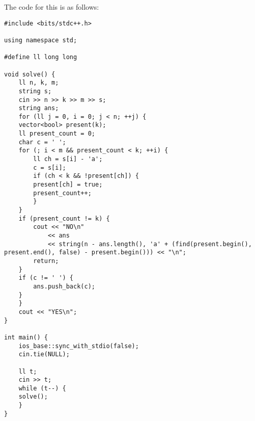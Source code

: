 \documentclass{article}
\begin{document}
The code for this is as follows:
\begin{verbatim}
#include <bits/stdc++.h>

using namespace std;

#define ll long long

void solve() {
    ll n, k, m;
    string s;
    cin >> n >> k >> m >> s;
    string ans;
    for (ll j = 0, i = 0; j < n; ++j) {
    vector<bool> present(k);
    ll present_count = 0;
    char c = ' ';
    for (; i < m && present_count < k; ++i) {
        ll ch = s[i] - 'a';
        c = s[i];
        if (ch < k && !present[ch]) {
        present[ch] = true;
        present_count++;
        }
    }
    if (present_count != k) {
        cout << "NO\n"
            << ans
            << string(n - ans.length(), 'a' + (find(present.begin(), present.end(), false) - present.begin())) << "\n";
        return;
    }
    if (c != ' ') {
        ans.push_back(c);
    }
    }
    cout << "YES\n";
}

int main() {
    ios_base::sync_with_stdio(false);
    cin.tie(NULL);

    ll t;
    cin >> t;
    while (t--) {
    solve();
    }
}
\end{verbatim}
\end{document}
